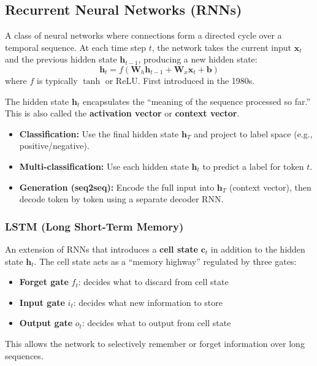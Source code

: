 \documentclass[11pt, a4paper]{article}
\begin{document}
\subsection{Recurrent Neural Networks (RNNs)}

\begin{defbox}
A class of neural networks where connections form a directed cycle over a temporal sequence. At each time step $t$, the network takes the current input $\mathbf{x}_t$ and the previous hidden state $\mathbf{h}_{t-1}$, producing a new hidden state:
\[
\mathbf{h}_t = f(\mathbf{W}_h \mathbf{h}_{t-1} + \mathbf{W}_x \mathbf{x}_t + \mathbf{b})
\]
where $f$ is typically $\tanh$ or ReLU. First introduced in the 1980s.
\end{defbox}

The hidden state $\mathbf{h}_t$ encapsulates the ``meaning of the sequence processed so far.'' This is also called the \textbf{activation vector} or \textbf{context vector}.

\begin{exbox}
\begin{itemize}[leftmargin=1.5em]
  \item \textbf{Classification:} Use the final hidden state $\mathbf{h}_T$ and project to label space (e.g., positive/negative).
  \item \textbf{Multi-classification:} Use each hidden state $\mathbf{h}_t$ to predict a label for token $t$.
  \item \textbf{Generation (seq2seq):} Encode the full input into $\mathbf{h}_T$ (context vector), then decode token by token using a separate decoder RNN.
\end{itemize}
\end{exbox}

\subsubsection{LSTM (Long Short-Term Memory)}

\begin{defbox}
An extension of RNNs that introduces a \textbf{cell state} $\mathbf{c}_t$ in addition to the hidden state $\mathbf{h}_t$. The cell state acts as a ``memory highway'' regulated by three gates:
\begin{itemize}[leftmargin=1.5em]
  \item \textbf{Forget gate} $f_t$: decides what to discard from cell state
  \item \textbf{Input gate} $i_t$: decides what new information to store
  \item \textbf{Output gate} $o_t$: decides what to output from cell state
\end{itemize}
This allows the network to selectively remember or forget information over long sequences.
\end{defbox}
\end{document}
